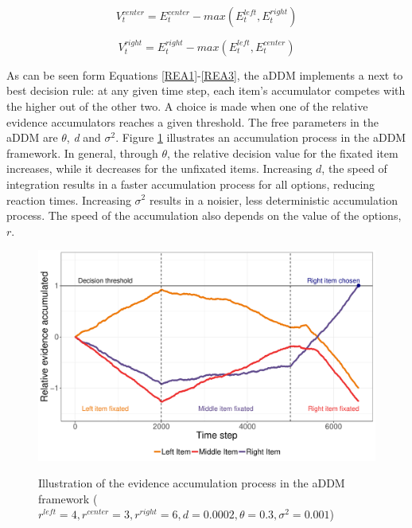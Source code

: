 \documentclass[11pt,a4paper]{article}
\begin{document}
\begin{equation} \label{REA2}
V_{t}^{center}=E_{t}^{center}-max(E_{t}^{left},E_{t}^{right})
\end{equation}


\begin{equation} \label{REA3}
V_{t}^{right}=E_{t}^{right}-max(E_{t}^{left},E_{t}^{center})
\end{equation}

As can be seen form Equations \ref{REA1}-\ref{REA3}, the aDDM implements a next to best decision rule: at any given time step, each item's accumulator competes with the higher out of the other two. A choice is made when one of the relative evidence accumulators reaches a given threshold. The free parameters in the aDDM are $\theta$, \textit{d} and $\sigma^{2}$. Figure \ref{fig:driftrates} illustrates an accumulation process in the aDDM framework. In general, through $\theta$, the relative decision value for the fixated item increases, while it decreases for the unfixated items. Increasing $d$, the speed of integration results in a faster accumulation process for all options, reducing reaction times. Increasing $\sigma^{2}$ results in a noisier, less deterministic accumulation process. The speed of the accumulation also depends on the value of the options, $r$. 

\begin{figure}
\captionsetup{justification=centering}
\caption{Illustration of the evidence accumulation process in the aDDM framework
($\mathit{\mathit{r^{left}=4, r^{center}=3, r^{right}=6, d=0.0002}, \theta=0.3, \sigma^{2}=0.001}$)}
\includegraphics[width=1\textwidth]{c1_driftrates.pdf}
\label{fig:driftrates}
\end{figure}
\end{document}
